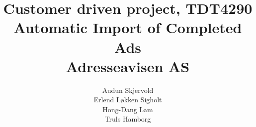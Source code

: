 \documentclass[12pt, a4paper]{article}
\title{\normalsize Customer driven project, TDT4290 \\ \LARGE \textbf{Automatic Import of Completed Ads} \normalsize \\Adresseavisen AS}
\author{Audun Skjervold \\ Erlend Løkken Sigholt \\ Hong-Dang Lam \\ Truls Hamborg}
\begin{document}
\maketitle 
\thispagestyle{empty}
\newpage




\tableofcontents
\newpage

\listoffigures
\newpage

\listoftables
\newpage




























\nocite{methodology}
 
 
 
\appendix 



\end{document}
